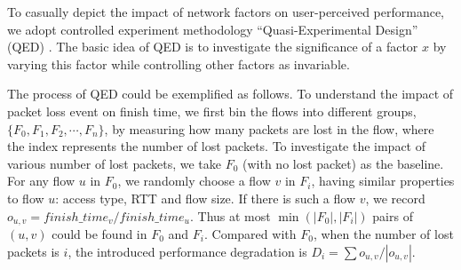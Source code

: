 To casually depict the impact of network factors on user-perceived performance, we adopt controlled experiment methodology ``Quasi-Experimental Design'' (QED) \cite{krishnan2013video}. The basic idea of QED is to investigate the significance of a factor $x$ by varying this factor while controlling other factors as invariable.

The process of QED could be exemplified as follows. To understand the impact of packet loss event on finish time, we first bin the flows into different groups, $\{ F_0, F_1, F_2, \cdots, F_n \}$, by measuring how many packets are lost in the flow, where the index represents the number of lost packets. To investigate the impact of various number of lost packets, we take $F_0$ (\ie with no lost packet) as the baseline. For any flow $u$ in $F_0$, we randomly choose a flow $v$ in $F_i$, having similar properties to flow $u$: access type, RTT and flow size. If there is such a flow $v$, we record $o_{u,v} = finish\_time_{v} / finish\_time_{u}$. Thus at most $\min(|F_0|, |F_i|)$ pairs of $(u,v)$ could be found in $F_0$ and $F_i$. Compared with $F_0$, when the number of lost packets is $i$, the introduced performance degradation is $D_{i} = \sum o_{u,v} / |o_{u,v}|$.